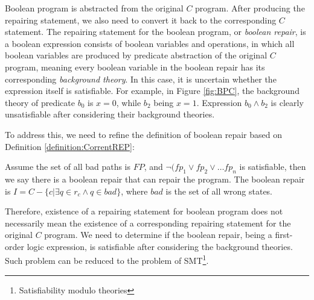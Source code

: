 Boolean program is abstracted from the original $C$ program. After producing the repairing statement, we also need to convert it back to the corresponding $C$ statement.
The repairing statement for the boolean program, or {\it boolean repair}, is a boolean expression consists of boolean variables and operations, in which all boolean variables are produced by predicate abstraction of the original $C$ program, meaning every boolean variable in the boolean repair has its corresponding {\it background theory}.
In this case, it is uncertain whether the expression itself is satisfiable.
For example, in Figure \ref{fig:BPC}, the background theory of predicate $b_{0}$ is $x = 0$, while $b_{2}$ being $x = 1$. Expression $b_{0} \wedge b_{2}$ is clearly unsatisfiable after considering their background theories.

To address this, we need to refine the definition of boolean repair based on Definition \ref{definition:CorrentREP}:

\begin{definition}
Assume the set of all bad paths is $FP$, and $\neg (fp_{1} \vee fp_{2} \vee\dots fp_{n}$ is satisfiable, then we say there is a boolean repair that can repair the program.
The boolean repair is $I = C - \{c | \exists q \in r_{c} \wedge q \in bad\}$, where $bad$ is the set of all wrong states.
\end{definition}

Therefore, existence of a repairing statement for boolean program does not necessarily mean the existence of a corresponding repairing statement for the original $C$ program.
We need to determine if the boolean repair, being a first-order logic expression, is satisfiable after considering the background theories. Such problem can be reduced to the problem of SMT\footnote{Satisfiability modulo theories}\cite{SMT}.

